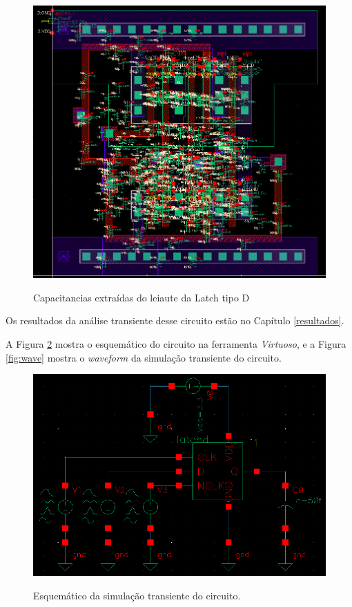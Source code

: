 \documentclass{iiufrgs}
\newcommand{\virtuoso}{\textit{Virtuoso}}
\begin{document}
\begin{figure}[htbp]
    \centering
    \caption{Capacitancias extraídas do leiaute da Latch tipo D}
    \includegraphics[scale=0.65]{images/cap.png}
    \label{fig:capacitancias}
\end{figure}

\FloatBarrier

Os resultados da análise transiente desse circuito estão no Capítulo \ref{resultados}.\

A Figura \ref{fig:trans} mostra o esquemático do circuito na ferramenta \virtuoso, e a Figura \ref{fig:wave} mostra o \textit{waveform} da simulação transiente do circuito.

\begin{figure}[htbp]
    \centering
    \caption{Esquemático da simulação transiente do circuito.}
    \includegraphics[scale=0.55]{images/schem.png}
    \label{fig:trans}
\end{figure}
\end{document}
